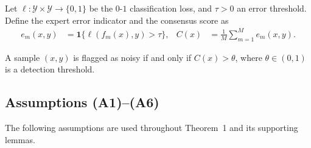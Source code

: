 Let $\ell : \mathcal{Y} \times \mathcal{Y} \to \{0,1\}$ be the $0$-$1$
classification loss, and $\tau > 0$ an error threshold. Define the
expert error indicator and the consensus score as
\begin{align}
e_m(x, y) &= \mathbf{1}\{\ell(f_m(x), y) > \tau\}, &
C(x) &= \frac{1}{M}\sum_{m=1}^M e_m(x, y).
\label{eq:consensus-score}
\end{align}

\begin{definition}
\label{def:detection-rule}
A sample $(x,y)$ is flagged as noisy if and only if $C(x) > \theta$, where
$\theta \in (0,1)$ is a detection threshold.
\end{definition}

\subsection{Assumptions (A1)--(A6)}
\label{sec:thm1:assumptions}

The following assumptions are used throughout Theorem~1 and its supporting
lemmas.

